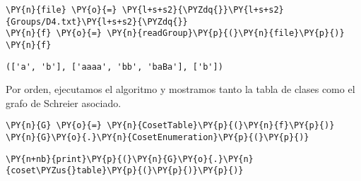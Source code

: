 \begin{enumerate} 

    \begin{tcolorbox}[breakable, size=fbox, boxrule=1pt, pad at break*=1mm,colback=cellbackground, colframe=cellborder]
\begin{Verbatim}[commandchars=\\\{\}]
\PY{n}{file} \PY{o}{=} \PY{l+s+s2}{\PYZdq{}}\PY{l+s+s2}{Groups/D4.txt}\PY{l+s+s2}{\PYZdq{}}
\PY{n}{f} \PY{o}{=} \PY{n}{readGroup}\PY{p}{(}\PY{n}{file}\PY{p}{)}
\PY{n}{f}
\end{Verbatim}
\end{tcolorbox}

    \begin{tcolorbox}[breakable, size=fbox, boxrule=.5pt, pad at break*=1mm, opacityfill=0]
\begin{Verbatim}[commandchars=\\\{\}]
(['a', 'b'], ['aaaa', 'bb', 'baBa'], ['b'])
\end{Verbatim}
\end{tcolorbox}
        
        
Por orden, ejecutamos el algoritmo y mostramos tanto la tabla de clases como el grafo de Schreier asociado.
    
    \begin{tcolorbox}[breakable, size=fbox, boxrule=1pt, pad at break*=1mm,colback=cellbackground, colframe=cellborder]
\begin{Verbatim}[commandchars=\\\{\}]
\PY{n}{G} \PY{o}{=} \PY{n}{CosetTable}\PY{p}{(}\PY{n}{f}\PY{p}{)}
\PY{n}{G}\PY{o}{.}\PY{n}{CosetEnumeration}\PY{p}{(}\PY{p}{)}
\end{Verbatim}
\end{tcolorbox}

    \begin{tcolorbox}[breakable, size=fbox, boxrule=1pt, pad at break*=1mm,colback=cellbackground, colframe=cellborder]
\begin{Verbatim}[commandchars=\\\{\}]
\PY{n+nb}{print}\PY{p}{(}\PY{n}{G}\PY{o}{.}\PY{n}{coset\PYZus{}table}\PY{p}{(}\PY{p}{)}\PY{p}{)}
\end{Verbatim}
\end{tcolorbox}

    \begin{center}
    \end{center}


\end{enumerate}
